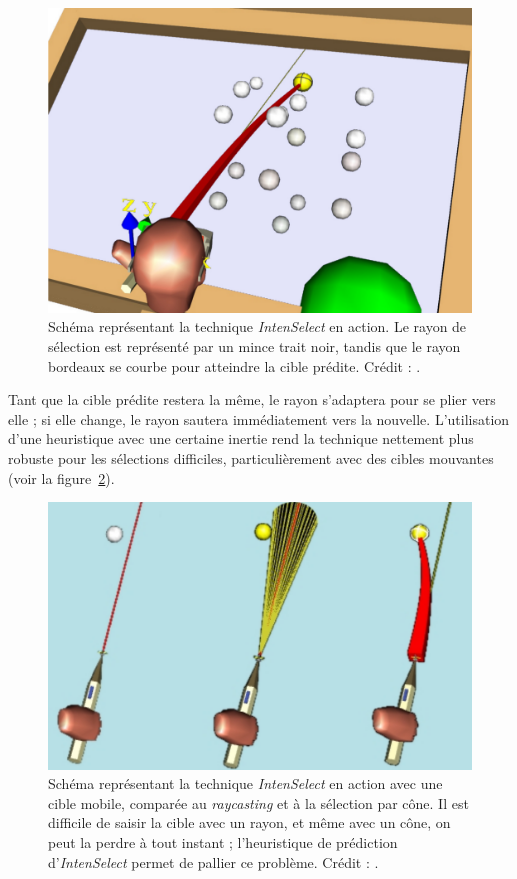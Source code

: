 	\begin{figure}[H]
		\centering
		\includegraphics[width=\textwidth]{figures/ch2/intenSnap}
		\caption[\emph{IntenSelect} -- \emph{Snapping feedback}]{Schéma représentant la technique \emph{IntenSelect} en action. Le rayon de sélection est représenté par un mince trait noir, tandis que le rayon bordeaux se courbe pour atteindre la cible prédite. Crédit : \cite{de2005intenselect}.}
		\label{fig:intenSnap}
	\end{figure}
	
	Tant que la cible prédite restera la même, le rayon s'adaptera pour se plier vers elle ; si elle change, le rayon sautera immédiatement vers la nouvelle. L'utilisation d'une heuristique avec une certaine \og inertie \fg{} rend la technique nettement plus robuste pour les sélections difficiles, particulièrement avec des cibles mouvantes (voir la figure~\ref{fig:intenSnap2}).
	
	\begin{figure}[htb]
		\centering
		\includegraphics[width=\textwidth]{figures/ch2/intenSnap2}
		\caption[\emph{IntenSelect} -- \emph{Snapping feedback} II]{Schéma représentant la technique \emph{IntenSelect} en action avec une cible mobile, comparée au \emph{raycasting} et à la sélection par cône. Il est difficile de saisir la cible avec un rayon, et même avec un cône, on peut la \og perdre \fg{} à tout instant ; l'heuristique de prédiction d'\emph{IntenSelect} permet de pallier ce problème. Crédit : \cite{de2005intenselect}.}
		\label{fig:intenSnap2}
	\end{figure}
	
